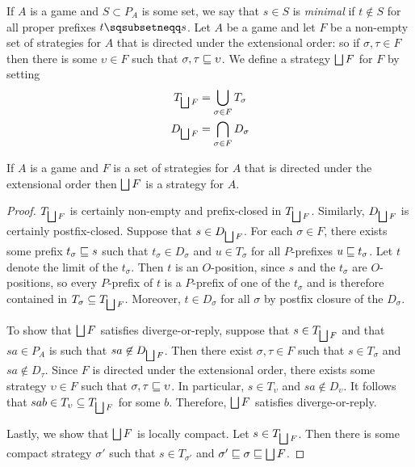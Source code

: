 \documentclass{article}
\begin{document}
If $A$ is a game and $S\subset P_A$ is some set, we say that $s\in S$ is \emph{minimal} if $t\not\in S$ for all proper prefixes $t\pprefix s$.  Let $A$ be a game and let $F$ be a non-empty set of strategies for $A$ that is directed under the extensional order: so if $\sigma,\tau\in F$ then there is some $\upsilon\in F$ such that $\sigma,\tau\sqsubseteq\upsilon$.  We define a strategy $\bigsqcup F$ for $F$ by setting
\begin{gather*}
  T_{\bigsqcup F} = \bigcup_{\sigma\in F}T_\sigma \\
  D_{\bigsqcup F} = \bigcap_{\sigma\in F}D_\sigma
\end{gather*}

\begin{proposition}
  If $A$ is a game and $F$ is a set of strategies for $A$ that is directed under the extensional order then $\bigsqcup F$ is a strategy for $A$.
  \begin{proof}
    $T_{\bigsqcup F}$ is certainly non-empty and prefix-closed in $T_{\bigsqcup F}$.  Similarly, $D_{\bigsqcup F}$ is certainly postfix-closed.  Suppose that $s\in D_{\bigsqcup F}$.  For each $\sigma\in F$, there exists some prefix $t_\sigma\sqsubseteq s$ such that $t_\sigma\in D_\sigma$ and $u\in T_\sigma$ for all $P$-prefixes $u\sqsubseteq t_\sigma$.  Let $t$ denote the limit of the $t_\sigma$.  Then $t$ is an $O$-position, since $s$ and the $t_\sigma$ are $O$-positions, so every $P$-prefix of $t$ is a $P$-prefix of one of the $t_\sigma$ and is therefore contained in $T_\sigma\subseteq T_{\bigsqcup F}$.  Moreover, $t\in D_\sigma$ for all $\sigma$ by postfix closure of the $D_\sigma$.  

    To show that $\bigsqcup F$ satisfies diverge-or-reply, suppose that $s\in T_{\bigsqcup F}$ and that $sa\in P_A$ is such that $sa\not\in D_{\bigsqcup F}$.  Then there exist $\sigma,\tau\in F$ such that $s\in T_\sigma$ and $sa\not\in D_\tau$.  Since $F$ is directed under the extensional order, there exists some strategy $\upsilon\in F$ such that $\sigma,\tau\sqsubseteq\upsilon$.  In particular, $s\in T_\upsilon$ and $sa\not\in D_\upsilon$.  It follows that $sab\in T_\upsilon\subseteq T_{\bigsqcup F}$ for some $b$.  Therefore, $\bigsqcup F$ satisfies diverge-or-reply.

    Lastly, we show that $\bigsqcup F$ is locally compact.  Let $s\in T_{\bigsqcup F}$.  Then there is some compact strategy $\sigma'$ such that $s\in T_{\sigma'}$ and $\sigma'\sqsubseteq\sigma\sqsubseteq\bigsqcup F$.  
  \end{proof}
\end{proposition}
\end{document}
